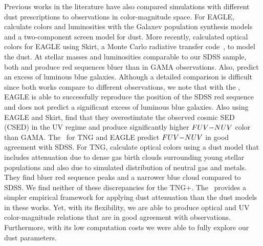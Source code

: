 Previous works in the literature have also compared simulations with different
dust prescriptions to observations in color-magnitude space. For EAGLE, 
\cite{trayford2015} calculate colors and luminosities with the {\sc Galaxev}
population synthesis models and a two-component screen model for dust. More
recently, \cite{trayford2017} calculated optical colors for EAGLE using {\sc
Skirt}, a Monte Carlo radiative transfer code~\citep{camps2015}, to model the
dust. At stellar masses and luminosities comparable to our SDSS sample, both 
\cite{trayford2015} and \cite{trayford2017} produce red sequences bluer than 
in GAMA observations. Also, \cite{trayford2015} predict an excess of luminous 
blue galaxies. Although a detailed comparison is difficult since both works 
compare to different observations, we note that with the \eda, EAGLE is able 
to successfully reproduce the position of the SDSS red sequence and does not 
predict a significant excess of luminous blue galaxies. Also using EAGLE and 
{\sc Skirt}, \cite{baes2019} find that they overestimtate the observed cosmic 
SED (CSED) in the UV regime and produce significantly higher $FUV{-}NUV$ color 
than GAMA. The \eda~for TNG and EAGLE predict $FUV{-}NUV$ in good agreement with
SDSS. 
For TNG, \cite{nelson2018} calculate optical colors using a dust model that
includes attenuation due to dense gas birth clouds surrounding young stellar
populations and also due to simulated distribution of neutral gas and metals.
They find bluer red sequence peaks and a narrower blue cloud compared to SDSS.
We find neither of these discrepancies for the TNG+\eda. The \eda~provides a
simpler empirical framework for applying dust attenuation than the dust models
in these works. Yet, with its flexibility, we are able to produce optical and
UV color-magnitude relations that are in good agreement with observations.
Furthermore, with its low computation costs we were able to fully
explore our dust parameters. 

 

 






